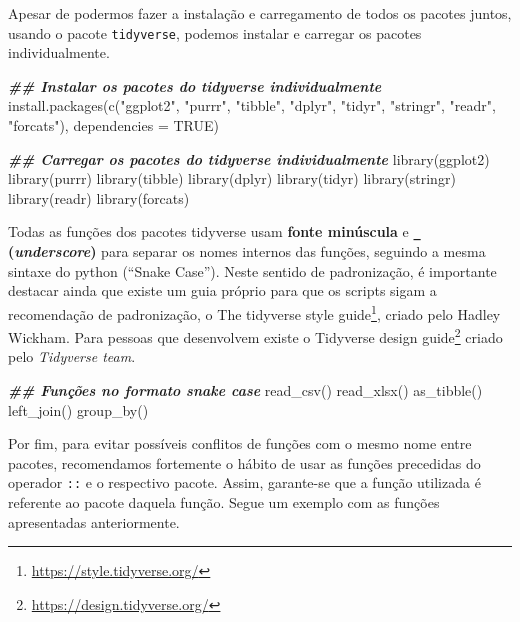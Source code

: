 \documentclass[
]{book}
\newenvironment{Shaded}{\begin{snugshade}}{\end{snugshade}}
\newcommand{\AttributeTok}[1]{\textcolor[rgb]{0.61,0.61,0.61}{#1}}
\newcommand{\ConstantTok}[1]{\textcolor[rgb]{0,0,0}{#1}}
\newcommand{\DocumentationTok}[1]{\textcolor[rgb]{0.37,0.37,0.37}{\textbf{\textit{#1}}}}
\newcommand{\FunctionTok}[1]{\textcolor[rgb]{0,0,0}{#1}}
\newcommand{\NormalTok}[1]{#1}
\newcommand{\StringTok}[1]{\textcolor[rgb]{0.5,0.5,0.5}{#1}}
\renewcommand{\href}[2]{#2\footnote{\url{#1}}}
\begin{document}
Apesar de podermos fazer a instalação e carregamento de todos os pacotes juntos, usando o pacote \texttt{tidyverse}, podemos instalar e carregar os pacotes individualmente.

\begin{Shaded}
\begin{Highlighting}[]
\DocumentationTok{\#\# Instalar os pacotes do tidyverse individualmente}
\FunctionTok{install.packages}\NormalTok{(}\FunctionTok{c}\NormalTok{(}\StringTok{"ggplot2"}\NormalTok{, }\StringTok{"purrr"}\NormalTok{, }\StringTok{"tibble"}\NormalTok{, }\StringTok{"dplyr"}\NormalTok{, }\StringTok{"tidyr"}\NormalTok{, }\StringTok{"stringr"}\NormalTok{, }
                   \StringTok{"readr"}\NormalTok{, }\StringTok{"forcats"}\NormalTok{), }\AttributeTok{dependencies =} \ConstantTok{TRUE}\NormalTok{)}

\DocumentationTok{\#\# Carregar os pacotes do tidyverse individualmente}
\FunctionTok{library}\NormalTok{(ggplot2)}
\FunctionTok{library}\NormalTok{(purrr)}
\FunctionTok{library}\NormalTok{(tibble)}
\FunctionTok{library}\NormalTok{(dplyr)}
\FunctionTok{library}\NormalTok{(tidyr)}
\FunctionTok{library}\NormalTok{(stringr)}
\FunctionTok{library}\NormalTok{(readr)}
\FunctionTok{library}\NormalTok{(forcats)}
\end{Highlighting}
\end{Shaded}

Todas as funções dos pacotes tidyverse usam \textbf{fonte minúscula} e \textbf{\texttt{\_} (\emph{underscore})} para separar os nomes internos das funções, seguindo a mesma sintaxe do python (``Snake Case''). Neste sentido de padronização, é importante destacar ainda que existe um guia próprio para que os scripts sigam a recomendação de padronização, o \href{https://style.tidyverse.org/}{The tidyverse style guide}, criado pelo Hadley Wickham. Para pessoas que desenvolvem existe o \href{https://design.tidyverse.org/}{Tidyverse design guide} criado pelo \emph{Tidyverse team}.

\begin{Shaded}
\begin{Highlighting}[]
\DocumentationTok{\#\# Funções no formato snake case}
\FunctionTok{read\_csv}\NormalTok{()}
\FunctionTok{read\_xlsx}\NormalTok{()}
\FunctionTok{as\_tibble}\NormalTok{()}
\FunctionTok{left\_join}\NormalTok{()}
\FunctionTok{group\_by}\NormalTok{()}
\end{Highlighting}
\end{Shaded}

Por fim, para evitar possíveis conflitos de funções com o mesmo nome entre pacotes, recomendamos fortemente o hábito de usar as funções precedidas do operador \texttt{::} e o respectivo pacote. Assim, garante-se que a função utilizada é referente ao pacote daquela função. Segue um exemplo com as funções apresentadas anteriormente.
\end{document}
